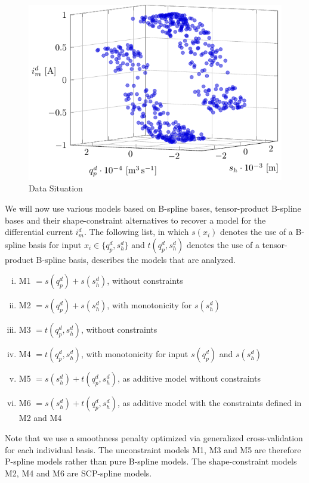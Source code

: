 \begin{figure}[H]
	\centering
	\includegraphics{graphics/pgfplots/cha5/Bosch/data_situation.pdf} 
	\caption{Data Situation}
	\label{fig:bosch_data_situation}
\end{figure}

We will now use various models based on B-spline bases, tensor-product B-spline bases and their shape-constraint alternatives to recover a model for the differential current $i_m^d$. The following list, in which $s(x_i)$ denotes the use of a B-spline basis for input $x_i \in \{q_p^d, s_h^d\}$ and $t(q_p^d, s_h^d)$ denotes the use of a tensor-product B-spline basis, describes the models that are analyzed.

\begin{enumerate}[(i)]
	\item M1 $= s(q_p^d) + s(s_h^d)$, without constraints
	\item M2 $= s(q_p^d) + s(s_h^d)$, with monotonicity for $s(s_h^d)$
	\item M3 $= t(q_p^d,s_h^d)$, without constraints
	\item M4 $= t(q_p^d,s_h^d)$, with monotonicity for input $s(q_p^d)$ and $s(s_h^d)$
	\item M5 $= s(s_h^d) + t(q_p^d,s_h^d)$, as additive model without constraints
	\item M6 $= s(s_h^d) + t(q_p^d,s_h^d)$, as additive model with the constraints defined in M2 and M4
\end{enumerate}
%
Note that we use a smoothness penalty optimized via generalized cross-validation for each individual basis. The unconstraint models M1, M3 and M5 are therefore P-spline models rather than pure B-spline models. The shape-constraint models M2, M4 and M6 are SCP-spline models. 


